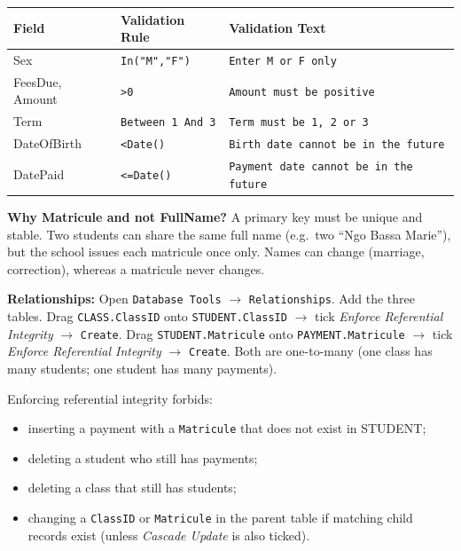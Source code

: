 \documentclass[11pt]{article}
\newcommand{\cle}[1]{{\popxbold\color{popdark}#1}}
\begin{document}
\begin{exemplebox}
\begin{center}
\begin{tabular}{|l|l|l|}
\hline
\rowcolor{popblueL} \textbf{Field} & \textbf{Validation Rule} & \textbf{Validation Text} \\
\hline
Sex & \texttt{In("M","F")} & \texttt{Enter M or F only} \\
\hline
FeesDue, Amount & \texttt{>0} & \texttt{Amount must be positive} \\
\hline
Term & \texttt{Between 1 And 3} & \texttt{Term must be 1, 2 or 3} \\
\hline
DateOfBirth & \texttt{<Date()} & \texttt{Birth date cannot be in the future} \\
\hline
DatePaid & \texttt{<=Date()} & \texttt{Payment date cannot be in the future} \\
\hline
\end{tabular}
\end{center}
\end{exemplebox}

\textbf{Why Matricule and not FullName?} A primary key must be \cle{unique} and \cle{stable}. Two students can share the same full name (e.g.\ two ``Ngo Bassa Marie''), but the school issues each matricule once only. Names can change (marriage, correction), whereas a matricule never changes.

\textbf{Relationships:} Open \texttt{Database Tools} $\rightarrow$ \texttt{Relationships}. Add the three tables. Drag \texttt{CLASS.ClassID} onto \texttt{STUDENT.ClassID} $\rightarrow$ tick \emph{Enforce Referential Integrity} $\rightarrow$ \texttt{Create}. Drag \texttt{STUDENT.Matricule} onto \texttt{PAYMENT.Matricule} $\rightarrow$ tick \emph{Enforce Referential Integrity} $\rightarrow$ \texttt{Create}. Both are \cle{one-to-many} (one class has many students; one student has many payments).

\begin{propriete}
Enforcing referential integrity forbids:
\begin{itemize}
\item inserting a payment with a \texttt{Matricule} that does not exist in STUDENT;
\item deleting a student who still has payments;
\item deleting a class that still has students;
\item changing a \texttt{ClassID} or \texttt{Matricule} in the parent table if matching child records exist (unless \emph{Cascade Update} is also ticked).
\end{itemize}
\end{propriete}
\end{document}
